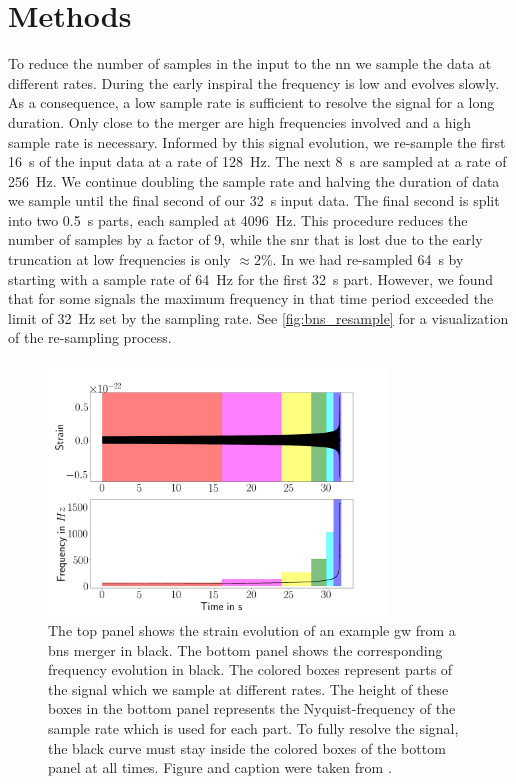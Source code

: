 \section{Methods}
To reduce the number of samples in the input to the \acrshort{nn} we sample the data at different rates. During the early inspiral the frequency is low and evolves slowly. As a consequence, a low sample rate is sufficient to resolve the signal for a long duration. Only close to the merger are high frequencies involved and a high sample rate is necessary. Informed by this signal evolution, we re-sample the first \SI{16}{\second} of the input data at a rate of \SI{128}{\hertz}. The next \SI{8}{\second} are sampled at a rate of \SI{256}{\hertz}. We continue doubling the sample rate and halving the duration of data we sample until the final second of our \SI{32}{\second} input data. The final second is split into two \SI{0.5}{\second} parts, each sampled at \SI{4096}{\hertz}. This procedure reduces the number of samples by a factor of 9, while the \acrshort{snr} that is lost due to the early truncation at low frequencies is only $\approx 2\%$. In \cite{Schaefer:2019:MSC} we had re-sampled \SI{64}{\second} by starting with a sample rate of \SI{64}{\hertz} for the first \SI{32}{\second} part. However, we found that for some signals the maximum frequency in that time period exceeded the limit of \SI{32}{\hertz} set by the sampling rate. See \autoref{fig:bns_resample} for a visualization of the re-sampling process. 
\begin{figure}
	\centering
	\includegraphics[width=0.8\textwidth]{chapters/bnsnet/images/resample_idea.png}
	\caption[Multi-rate sampling]{The top panel shows the strain evolution of an example \acrshort{gw} from a \acrshort{bns} merger in black. The bottom panel shows the corresponding frequency evolution in black. The colored boxes represent parts of the signal which we sample at different rates. The height of these boxes in the bottom panel represents the Nyquist-frequency of the sample rate which is used for each part. To fully resolve the signal, the black curve must stay inside the colored boxes of the bottom panel at all times. Figure and caption were taken from \cite{Schafer:2020kor}.}\label{fig:bns_resample}
\end{figure}

